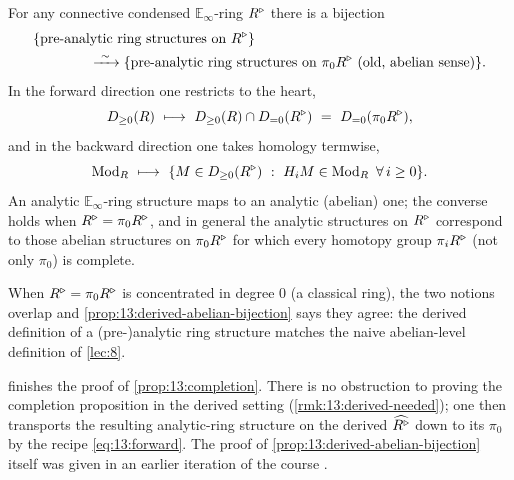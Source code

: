 \begin{proposition}
\label{prop:13:derived-abelian-bijection}
For any connective condensed $\mathbb{E}_\infty$-ring $R^{\triangleright}$ there is a bijection
\begin{equation*}
\begin{aligned}
&\{\text{pre-analytic ring structures on }R^{\triangleright}\}\\
&\hspace{4em}\xrightarrow{\ \sim\ }
\{\text{pre-analytic ring structures on }\pi_0R^{\triangleright}\ (\text{old, abelian sense})\}.
\end{aligned}
\end{equation*}
In the forward direction one restricts to the heart,
\begin{equation}
\label{eq:13:forward}
D_{\ge 0}(R)\ \longmapsto\ D_{\ge 0}(R)\cap D_{=0}(\ur R)\ =\ D_{=0}(\pi_0\ur R),
\end{equation}
and in the backward direction one takes homology termwise,
\begin{equation}
\label{eq:13:backward}
\Mod_R\ \longmapsto\ \{M\in D_{\ge 0}(\ur R)\ :\ H_i M\in\Mod_R\ \forall\, i\ge 0\}.
\end{equation}
An analytic $\mathbb{E}_\infty$-ring structure maps to an analytic (abelian) one;
the converse holds when $R^{\triangleright}=\pi_0R^{\triangleright}$, and in general the analytic
structures on $R^{\triangleright}$ correspond to those abelian structures on $\pi_0R^{\triangleright}$ for
which every homotopy group $\pi_iR^{\triangleright}$ (not only $\pi_0$) is complete.
\end{proposition}

\begin{remark}
\label{rmk:13:consistency}
When $R^{\triangleright}=\pi_0R^{\triangleright}$ is concentrated in degree $0$ (a classical ring), the two
notions overlap and \cref{prop:13:derived-abelian-bijection} says they agree: the
derived definition of a (pre-)analytic ring structure matches the naive
abelian-level definition of \cref{lec:8}.
\end{remark}

 finishes the proof of
\cref{prop:13:completion}. There is no obstruction to proving the completion
proposition in the derived setting (\cref{rmk:13:derived-needed}); one then
transports the resulting analytic-ring structure on the derived $\widehat{R^{\triangleright}}$
down to its $\pi_0$ by the recipe \eqref{eq:13:forward}. The proof of
\cref{prop:13:derived-abelian-bijection} itself was given in an earlier iteration
of the course \cite{scholze2020analytic}.

